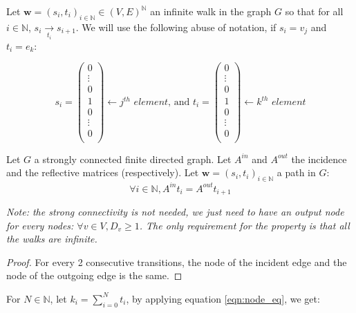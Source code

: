 \documentclass{article}
\begin{document}
Let $\mathbf{w} = (s_i,t_i)_{i\in \mathbb{N}} \in \left(V,E\right)^\mathbb{N}$
an infinite walk in the graph $G$ so that for all $i \in \mathbb{N}$, $s_i \xrightarrow[t_i]{} s_{i+1}$. We will use the following abuse of notation, if $s_i = v_j$ and $t_i = e_k$:

\begin{equation*}
s_i = \left(
\begin{array}{c}
0\\
\vdots\\
0\\
1\\
0\\
\vdots\\
0\\
\end{array}
\right)
\leftarrow \textit{$j^{th}$ element}
\textrm{, and }
t_i = \left(
\begin{array}{c}
0\\
\vdots\\
0\\
1\\
0\\
\vdots\\
0\\
\end{array}
\right)
\leftarrow \textit{$k^{th}$ element}
\end{equation*}


\begin{property} Let $G$ a strongly connected finite directed graph. Let $A^{in}$ and $A^{out}$ the incidence and the reflective matrices (respectively). Let $\mathbf{w} = (s_i,t_i)_{i\in \mathbb{N}}$ a path in $G$:
\begin{equation} \label{eqn:node_eq}
\forall i \in \mathbb{N}, A^{in} t_i = A^{out} t_{i+1}
\end{equation}
\end{property}

\textit{Note: the strong connectivity is not needed, we just need to have an output node for every nodes: $\forall v \in V, D_v \geq 1$. The only requirement for the property is that all the walks are infinite.}

\begin{proof}
For every 2 consecutive transitions, the node of the incident edge and the node of the outgoing edge is the same.
\end{proof}

For $N \in \mathbb{N}$, let $k_i = \sum_{i=0}^N t_i$, by applying equation \ref{eqn:node_eq}, we get:
\end{document}
